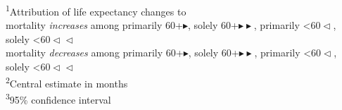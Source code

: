 \documentclass[12pt]{article}
\begin{document}
\begin{table}[ht]
\begin{tabular}
\bottomrule
\end{tabular}
\vspace{-5mm}
\begin{minipage}{\linewidth}
\textsuperscript{1}Attribution of life expectancy changes to \\
mortality \emph{increases} among {\color{negativesig}primarily 60+$\blacktriangleright$}, {\color{negativesig}solely 60+$\blacktriangleright\blacktriangleright$}, {\color{negativesig}primarily \textless{}60$\vartriangleleft$}, {\color{negativesig}solely \textless{}60$\vartriangleleft\vartriangleleft$} \\
mortality \emph{decreases} among {\color{positivesig}primarily 60+$\blacktriangleright$}, {\color{positivesig}solely 60+$\blacktriangleright\blacktriangleright$}, {\color{positivesig}primarily \textless{}60$\vartriangleleft$}, {\color{positivesig}solely \textless{}60$\vartriangleleft\vartriangleleft$} \\
\textsuperscript{2}Central estimate in months \\
\textsuperscript{3}95\% confidence interval \\
\end{minipage}
\caption{Months of male life expectancy (LE) changes and deficits (labelled ES) since the start of the pandemic attributed to age-specific mortality changes (labelled AT). LE deficit is defined as observed minus expected life expectancy had pre-pandemic mortality trends continued.}
\label{tab:arriagaM}
\end{table}
\end{document}
